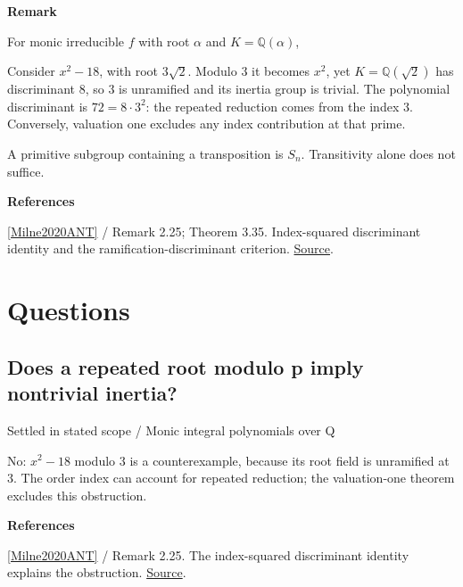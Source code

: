 \documentclass[11pt,a4paper,oneside,openany]{book}
\newcommand{\atlasdisplay}[1]{\par\begingroup\centering\vspace{3pt}\noindent\adjustbox{max width=\linewidth}{\(\displaystyle #1\)}\par\vspace{5pt}\endgroup}
\newenvironment{sources}{\par\smallskip\begingroup\footnotesize\color{atlasgray}\leftskip=10pt\setlength{\parskip}{2pt}}{\par\endgroup\smallskip}
\begin{document}
\begin{atlasblock}[boundary]
\textbf{\sffamily Remark}\par\smallskip
\color{black} For monic irreducible \(f\) with root \(\alpha\) and \(K=\mathbb Q(\alpha)\),\par

\atlasdisplay{\Delta(f)=\operatorname{disc}(K)\,[\mathcal O_K:\mathbb Z[\alpha]]^2.}
\color{black} Consider \(x^2-18\), with root \(3\sqrt2\). Modulo \(3\) it becomes \(x^2\), yet \(K=\mathbb Q(\sqrt2)\) has discriminant \(8\), so \(3\) is unramified and its inertia group is trivial. The polynomial discriminant is \(72=8\cdot3^2\): the repeated reduction comes from the index \(3\). Conversely, valuation one excludes any index contribution at that prime.\par
\end{atlasblock}\color{black}
\color{black} A primitive subgroup containing a transposition is \(S_n\). Transitivity alone does not suffice.\par
\begin{sources}
\textbf{References}\par\smallskip
\noindent\hyperlink{ref:Milne2020ANT}{[Milne2020ANT]} / Remark 2.25; Theorem 3.35. Index-squared discriminant identity and the ramification-discriminant criterion. \href{https://www.jmilne.org/math/CourseNotes/ANT.pdf}{Source}.\par
\end{sources}\color{black}
\section*{Questions}
\subsection*{Does a repeated root modulo p imply nontrivial inertia?}
{\small\sffamily\color{atlasgold}Settled in stated scope / Monic integral polynomials over Q}\par\smallskip
\color{black} No: \(x^2-18\) modulo \(3\) is a counterexample, because its root field is unramified at \(3\). The order index can account for repeated reduction; the valuation-one theorem excludes this obstruction.\par
\begin{sources}
\textbf{References}\par\smallskip
\noindent\hyperlink{ref:Milne2020ANT}{[Milne2020ANT]} / Remark 2.25. The index-squared discriminant identity explains the obstruction. \href{https://www.jmilne.org/math/CourseNotes/ANT.pdf}{Source}.\par
\end{sources}\color{black}
\end{document}
